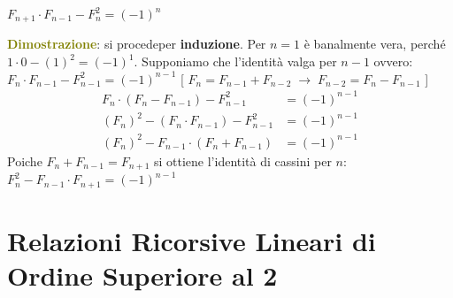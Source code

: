 \begin{flushleft}
    {\centering
        $F_{n+1} \cdot F_{n-1} - F_n^2 = (-1)^n$
    \par}
    \begin{boxA}
        \textcolor{olive}{\textbf{Dimostrazione}}: si procedeper \textbf{induzione}. Per $n=1$ è banalmente vera, perché $1 \cdot 0 - (1)^2 = (-1)^1$. Supponiamo che l'identità valga per $n-1$ ovvero: $F_n \cdot F_{n-1} - F_{n-1}^2 = (-1)^{n-1}$ [ $F_n = F_{n-1} + F_{n-2} \; \rightarrow \; F_{n-2} = F_n - F_{n-1}$ ]
        \begin{align*}
            F_n \cdot (F_n - F_{n-1}) - F_{n-1}^2 &= (-1)^{n-1} \\
            (F_n)^2 - (F_n \cdot F_{n-1}) -F_{n-1}^2 &= (-1)^{n-1} \\
            (F_n)^2 - F_{n-1} \cdot (F_n + F_{n-1}) &= (-1)^{n-1}
        \end{align*}
        Poiche $F_n + F_{n-1} = F_{n+1}$ si ottiene l'identità di cassini per $n$: $F_n^2 - F_{n-1} \cdot F_{n+1} = (-1)^{n-1}$
    \end{boxA}
\end{flushleft}

\section{Relazioni Ricorsive Lineari di Ordine Superiore al 2}

